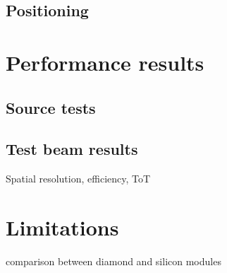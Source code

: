 \documentclass[12pt]{packages/mytustyle}  %
\begin{document}
\subsection{Positioning}

\section{Performance results}
\label{sec:perfresults}

\subsection{Source tests}
\subsection{Test beam results}
Spatial resolution, efficiency, ToT


\section{Limitations}
\label{sec:limitations}

comparison between diamond and silicon modules






\end{document}
